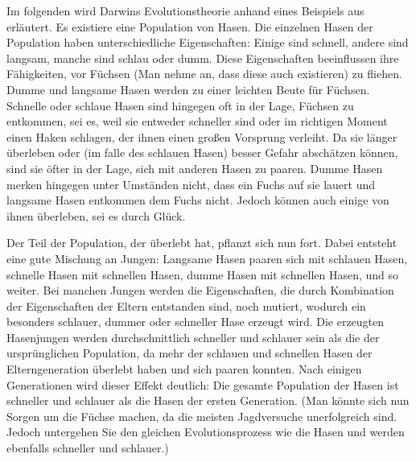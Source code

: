 Im folgenden wird Darwins Evolutionstheorie anhand eines Beispiels aus \cite{Rabbits:1} erläutert. Es existiere eine Population von Hasen. Die einzelnen Hasen der Population haben unterschiedliche Eigenschaften: Einige sind schnell, andere sind langsam, manche sind schlau oder dumm. Diese Eigenschaften beeinflussen ihre Fähigkeiten, vor Füchsen (Man nehme an, dass diese auch existieren) zu fliehen. Dumme und langsame Hasen werden zu einer leichten Beute für Füchsen. Schnelle oder schlaue Hasen sind hingegen oft in der Lage, Füchsen zu entkommen, sei es, weil sie entweder schneller sind oder im richtigen Moment einen Haken schlagen, der ihnen einen großen Vorsprung verleiht. Da sie länger überleben oder (im falle des schlauen Hasen) besser Gefahr abschätzen können, sind sie öfter in der Lage, sich mit anderen Hasen zu paaren. Dumme Hasen merken hingegen unter Umständen nicht, dass ein Fuchs auf sie lauert und langsame Hasen entkommen dem Fuchs nicht. Jedoch können auch einige von ihnen überleben, sei es durch Glück. 

Der Teil der Population, der überlebt hat, pflanzt sich nun fort. Dabei entsteht eine gute Mischung an Jungen: Langsame Hasen paaren sich mit schlauen Hasen, schnelle Hasen mit schnellen Hasen, dumme Hasen mit schnellen Hasen, und so weiter. Bei manchen Jungen werden die Eigenschaften, die durch Kombination der Eigenschaften der Eltern entstanden sind, noch mutiert, wodurch ein besonders schlauer, dummer oder schneller Hase erzeugt wird. Die erzeugten Hasenjungen werden durchschnittlich schneller und schlauer sein als die der ursprünglichen Population, da mehr der schlauen und schnellen Hasen der Elterngeneration überlebt haben und sich paaren konnten. Nach einigen Generationen wird dieser Effekt deutlich: Die gesamte Population der Hasen ist schneller und schlauer als die Hasen der ersten Generation. (Man könnte sich nun Sorgen um die Füchse machen, da die meisten Jagdversuche unerfolgreich sind. Jedoch untergehen Sie den gleichen Evolutionsprozess wie die Hasen und werden ebenfalls schneller und schlauer.)

